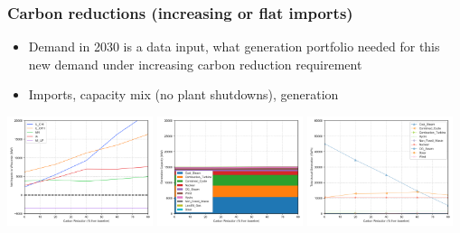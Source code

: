 \documentclass[xcolor=dvipsnames]{beamer}
\begin{document}
\begin{frame}
  \frametitle{Carbon reductions (increasing or flat imports)}

\begin{itemize}
  \item Demand in 2030 is a data input, what generation portfolio
    needed for this new demand under increasing carbon reduction requirement
  \item Imports, capacity mix (no plant shutdowns),  generation
\end{itemize}


  \includegraphics[width=0.32\textwidth]{includes/leakage_no_shutdowns_agg_exim.png}
  \includegraphics[width=0.32\textwidth]{includes/leakage_no_shutdowns_agg_capacity_cntlreg.png}
  \includegraphics[width=0.32\textwidth]{includes/leakage_no_shutdowns_agg_generation_cntlreg.png}


\end{frame}
\end{document}
